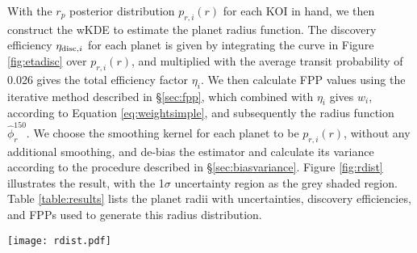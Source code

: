 \documentclass[iop]{emulateapj}
\def\Kepler{\textit{Kepler}}
\def\Rearth{R_\oplus}
\def\Pmax{150}
\def\npps{2.00}
\def\enpps{0.45}
\begin{document}
With the $r_p$ posterior distribution $p_{r,i}(r)$ for each KOI in hand, we then construct the wKDE to estimate the planet radius function.  The discovery efficiency $\eta_{{\rm disc},i}$ for each planet is given by integrating the curve in Figure \ref{fig:etadisc} over $p_{r,i}(r)$, and multiplied with the average transit probability of 0.026 gives the total efficiency factor $\eta_i$.  We then calculate FPP values using the iterative method described in \S\ref{sec:fpp}, which combined with $\eta_i$ gives $w_i$, according to Equation \ref{eq:weightsimple}, and subsequently the radius function $\hat\phi_r^{\Pmax}$.  We choose the  smoothing kernel for each planet to be $p_{r,i}(r)$, without any additional smoothing, and de-bias the estimator and calculate its variance according to the procedure described in \S\ref{sec:biasvariance}.  Figure \ref{fig:rdist} illustrates the result, with the 1$\sigma$ uncertainty region as the grey shaded region.  Table \ref{table:results} lists the planet radii with uncertainties, discovery efficiencies, and FPPs used to generate this radius distribution.




\begin{figure*}[htbp]
   \centering
   \texttt{[image: rdist.pdf]} %
   \caption{The empirical radius distribution of planets orbiting M dwarfs with periods $<$\Pmax\ days (black continuous curve), estimated with a weighted kernel density estimator (wKDE; see \S\ref{sec:rdist}), with the bootstrap resampling-derived 1$\sigma$ uncertainty swath shaded grey---analogous to a running poisson error bar.  The detection efficiency as a function of signal-to-noise ratio has been quantified according to the estimate from the \Kepler\ detection pipeline shown in Figure \ref{fig:snrdists}.  The blue horizontal lines represent the standard ``occurrence rate per bin'' calculations for this sample, derived by integrating the density estimator over each bin.  The solid blue lines are linearly-spaced bins; the dotted blue lines are the logarithmically spaced bins used by \citet{dressing2013} and \citet{petigura2013b}.  The vertical red lines represent the radii of individual planets in the sample, with their heights being proportional to the weight factors $w_i$.   There is an average of $\npps \pm \enpps$  planets per cool star in orbits $<$\Pmax\ days over this radius range, and there is an average of greater than 1 planet per cool star in this period range for radii between 0.5 and 1.5 $\Rearth$.}
   \label{fig:rdist}
\end{figure*}
\end{document}
